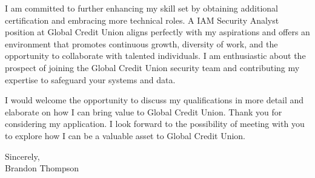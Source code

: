 \documentclass{resume} %
\newcommand\company{Global Credit Union}
\newcommand\position{IAM Security Analyst}
\begin{document}
I am committed to further enhancing my skill set by obtaining additional certification and embracing more technical roles.
A \position{} position at \company{} aligns perfectly with my aspirations and offers an environment that promotes continuous growth, diversity of work, and the opportunity to collaborate with talented individuals.
I am enthusiastic about the prospect of joining the \company{} security team and contributing my expertise to safeguard your systems and data.

I would welcome the opportunity to discuss my qualifications in more detail and elaborate on how I can bring value to \company{}.
Thank you for considering my application.
I look forward to the possibility of meeting with you to explore how I can be a valuable asset to \company{}. 

Sincerely,\\
Brandon Thompson
\end{document}
